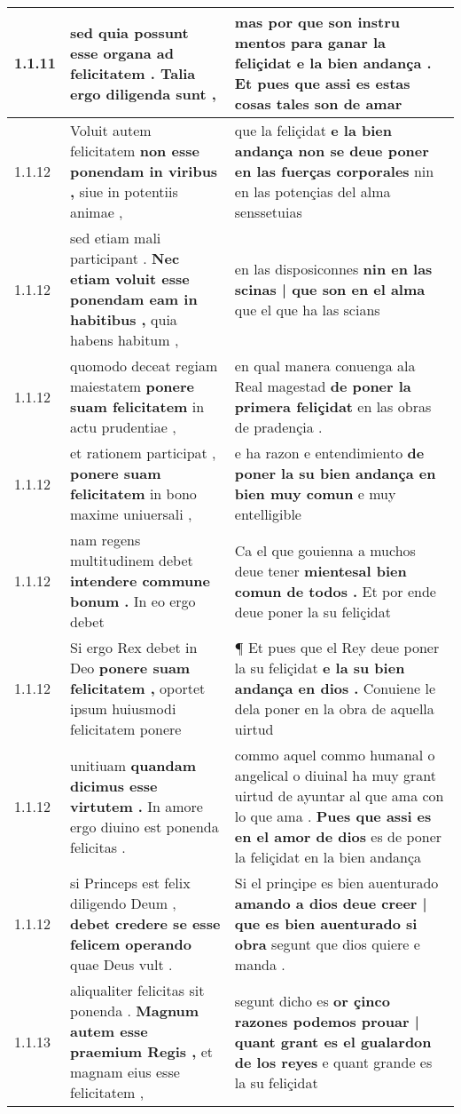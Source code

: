 \begin{tabular}{|p{1cm}|p{6.5cm}|p{6.5cm}|}
1.1.11 & sed quia possunt \textbf{ esse organa ad felicitatem . } Talia ergo diligenda sunt , & mas por que son instru mentos \textbf{ para ganar la feliçidat e la bien andança . } Et pues que assi es estas cosas tales son de amar \\\hline
1.1.12 & Voluit autem felicitatem \textbf{ non esse ponendam in viribus , } siue in potentiis animae , & que la feliçidat \textbf{ e la bien andança non se deue poner en las fuerças corporales } nin en las potençias del alma senssetuias \\\hline
1.1.12 & sed etiam mali participant . \textbf{ Nec etiam voluit esse ponendam eam in habitibus , } quia habens habitum , & en las disposiconnes \textbf{ nin en las scinas | que son en el alma } que el que ha las scians \\\hline
1.1.12 & quomodo deceat regiam maiestatem \textbf{ ponere suam felicitatem } in actu prudentiae , & en qual manera conuenga ala Real magestad \textbf{ de poner la primera feliçidat } en las obras de pradençia . \\\hline
1.1.12 & et rationem participat , \textbf{ ponere suam felicitatem } in bono maxime uniuersali , & e ha razon e entendimiento \textbf{ de poner la su bien andança en bien muy comun } e muy entelligible \\\hline
1.1.12 & nam regens multitudinem debet \textbf{ intendere commune bonum . } In eo ergo debet & Ca el que gouienna a muchos deue tener \textbf{ mientesal bien comun de todos . } Et por ende deue poner la su feliçidat \\\hline
1.1.12 & Si ergo Rex debet in Deo \textbf{ ponere suam felicitatem , } oportet ipsum huiusmodi felicitatem ponere & ¶ Et pues que el Rey deue poner la su feliçidat \textbf{ e la su bien andança en dios . } Conuiene le dela poner en la obra de aquella uirtud \\\hline
1.1.12 & unitiuam \textbf{ quandam dicimus esse virtutem . } In amore ergo diuino est ponenda felicitas . & commo aquel commo humanal o angelical o diuinal ha muy grant uirtud de ayuntar al que ama con lo que ama . \textbf{ Pues que assi es en el amor de dios } es de poner la feliçidat en la bien andança \\\hline
1.1.12 & si Princeps est felix diligendo Deum , \textbf{ debet credere se esse felicem operando } quae Deus vult . & Si el prinçipe es bien auenturado \textbf{ amando a dios deue creer | que es bien auenturado si obra } segunt que dios quiere e manda . \\\hline
1.1.13 & aliqualiter felicitas sit ponenda . \textbf{ Magnum autem esse praemium Regis , } et magnam eius esse felicitatem , & segunt dicho es \textbf{ or çinco razones podemos prouar | quant grant es el gualardon de los reyes } e quant grande es la su feliçidat \\\hline

\end{tabular}

